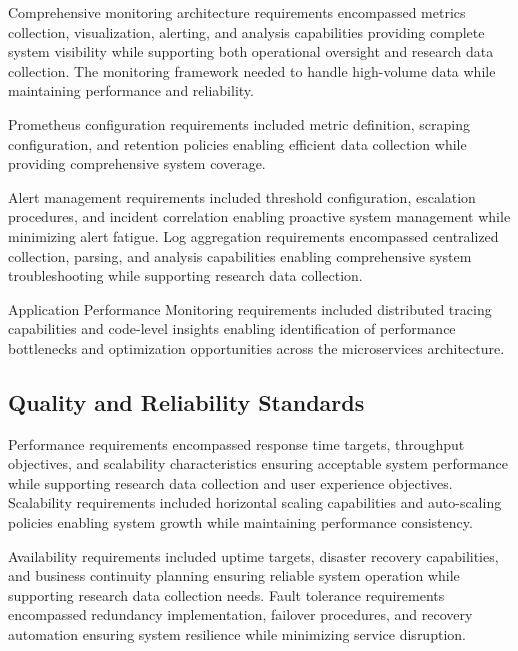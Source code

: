 Comprehensive monitoring architecture requirements encompassed metrics collection, visualization, alerting, and analysis capabilities providing complete system visibility while supporting both operational oversight and research data collection. The monitoring framework needed to handle high-volume data while maintaining performance and reliability.

Prometheus configuration \cite{prometheus_docs2023} requirements included metric definition, scraping configuration, and retention policies enabling efficient data collection while providing comprehensive system coverage.


Alert management requirements included threshold configuration, escalation procedures, and incident correlation enabling proactive system management while minimizing alert fatigue. Log aggregation requirements encompassed centralized collection, parsing, and analysis capabilities enabling comprehensive system troubleshooting while supporting research data collection.

Application Performance Monitoring requirements included distributed tracing capabilities and code-level insights enabling identification of performance bottlenecks and optimization opportunities across the microservices architecture.

\subsection{Quality and Reliability Standards}

Performance requirements encompassed response time targets, throughput objectives, and scalability characteristics ensuring acceptable system performance while supporting research data collection and user experience objectives. Scalability requirements included horizontal scaling capabilities and auto-scaling policies enabling system growth while maintaining performance consistency.


Availability requirements included uptime targets, disaster recovery capabilities, and business continuity planning ensuring reliable system operation while supporting research data collection needs. Fault tolerance requirements encompassed redundancy implementation, failover procedures, and recovery automation ensuring system resilience while minimizing service disruption.


